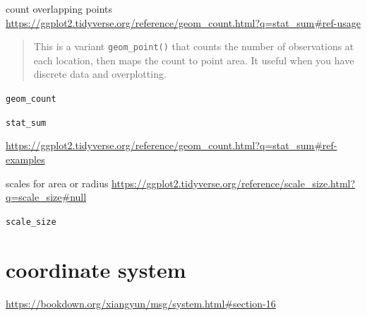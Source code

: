 \documentclass[
]{book}
\theoremstyle{definition}
\theoremstyle{definition}
\theoremstyle{definition}
\theoremstyle{definition}
\theoremstyle{remark}
\begin{document}
count overlapping points \url{https://ggplot2.tidyverse.org/reference/geom_count.html?q=stat_sum\#ref-usage}

\begin{quote}
This is a variant \texttt{geom\_point()} that counts the number of observations at each location, then maps the count to point area. It useful when you have discrete data and overplotting.
\end{quote}

\texttt{geom\_count}

\texttt{stat\_sum}

\url{https://ggplot2.tidyverse.org/reference/geom_count.html?q=stat_sum\#ref-examples}

scales for area or radius \url{https://ggplot2.tidyverse.org/reference/scale_size.html?q=scale_size\#null}

\texttt{scale\_size}

\hypertarget{coordinate-system}{%
\section{coordinate system}\label{coordinate-system}}

\url{https://bookdown.org/xiangyun/msg/system.html\#section-16}
\end{document}
